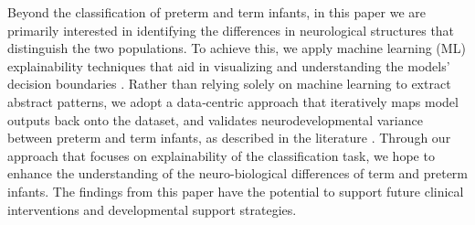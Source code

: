 \documentclass[doubleblind]{ecai}
\begin{document}



Beyond the classification of preterm and term infants, in this paper we are primarily interested in identifying the differences in neurological structures that distinguish the two populations. To achieve this, we apply machine learning (ML) explainability techniques that aid in visualizing and understanding the models' decision boundaries \cite{gilpin2018explaining,lundberg2017unified}. Rather than relying solely on machine learning to extract abstract patterns, we adopt a data‑centric approach that iteratively maps model outputs back onto the dataset, and validates neurodevelopmental variance between preterm and term infants, as described in the literature \cite{gilmore2018imaging,ream2018neurologic,batalle2017early,ball2012effect,engle2006recommendation,hou2024sensitivity,jukic2013length,karnati2020late,lee2021cingulum,moutquin2003classification}.
Through our approach that focuses on explainability of the classification task, we hope to enhance the understanding of the neuro-biological differences of term and preterm infants. The findings from this paper have the potential to support future clinical interventions and developmental support strategies.
\end{document}
